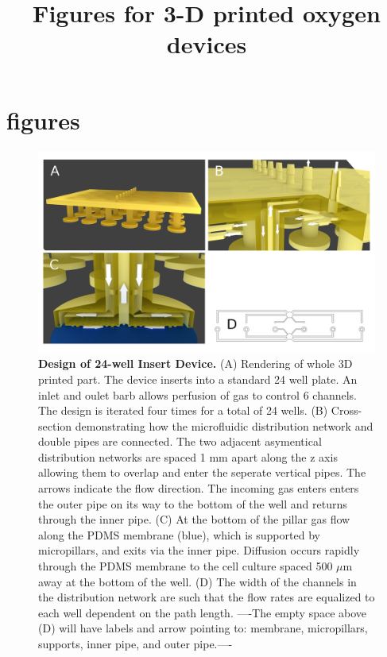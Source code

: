 \documentclass[]{article}
\title{Figures for  3-D printed oxygen devices}
\author{}
\begin{document}

\section{figures}

\begin{figure}[H]
\includegraphics[scale=0.2]{fig1.png} 
\caption{
{\bf Design of 24-well Insert Device.}
(A) Rendering of whole 3D printed part.
The device inserts into a standard 24 well plate.
An inlet and oulet barb allows perfusion of gas to control 6 channels.
The design is iterated four times for a total of 24 wells.
(B) Cross-section demonstrating how the microfluidic distribution network and double pipes are connected. 
The two adjacent asymentical distribution networks are spaced 1 mm apart along the z axis allowing them to overlap and enter the seperate vertical pipes.
The arrows indicate the flow direction.
The incoming gas enters enters the outer pipe on its way to the bottom of the well and returns through the inner pipe.
(C) At the bottom of the pillar gas flow along the PDMS membrane (blue), which is supported by micropillars, and exits via the inner pipe.
Diffusion occurs rapidly through the PDMS membrane to the cell culture spaced 500 $\mu$m away at the bottom of the well.
(D) The width of the channels in the distribution network are such that the flow rates are equalized to each well dependent on the path length.
----The empty space above (D) will have labels and arrow pointing to: membrane, micropillars, supports, inner pipe, and outer pipe.----
}
\label{figure1}
\end{figure}
\end{document}
